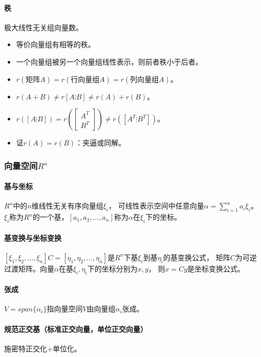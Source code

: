 \documentclass[
12pt, %
a4paper, 
oneside, %
headinclude,footinclude, %
]{scrartcl}
\begin{document}
\paragraph{秩}
极大线性无关组向量数。
\begin{itemize}
\item 等价向量组有相等的秩。
\item 一个向量组被另一个向量组线性表示，则前者秩小于后者。
\item $ r(\text{矩阵}A) = r(\text{行向量组}A) = r(\text{列向量组}A) $。
\item $ r(A + B) \neq r[A \vdots B] \neq r(A) + r(B) $。
\item $ r([A \vdots B]) = r(\begin{bmatrix} A^T \\ B^T \end{bmatrix}) \neq r([A^T \vdots B^T]) $。
\item 证$ r(A) = r(B) $：夹逼或同解。
\end{itemize}
\subsubsection[向量空间]{向量空间$ R^n $}
\paragraph{基与坐标}
$ R^n $中的$ n $维线性无关有序向量组$ \xi_i $，
可线性表示空间中任意向量$ \alpha = \sum_{i = 1}^n a_i \xi_i $。
$ \xi_i $称为$ R^n $的一个基，$ [a_1, a_2, \dots, a_n] $称为$ \alpha $在$ \xi_i $下的坐标。
\paragraph{基变换与坐标变换}
$ [\xi_1, \xi_2, \dots, \xi_n]C = [\eta_1, \eta_2, \dots, \eta_n] $是$ R^n $下基$ \xi_i $到基$ \eta_i $的基变换公式，
矩阵$ C $为可逆过渡矩阵。向量$ \alpha $在基$ \xi_i,\eta_i $下的坐标分别为$ x,y $，
则$ x = Cy $是坐标变换公式。
\paragraph{张成}
$ V = span\{\alpha_i\} $指向量空间$ V $由向量组$ \alpha_i $张成。
\paragraph{规范正交基（标准正交向量，单位正交向量）}
施密特正交化$ + $单位化。
\end{document}
